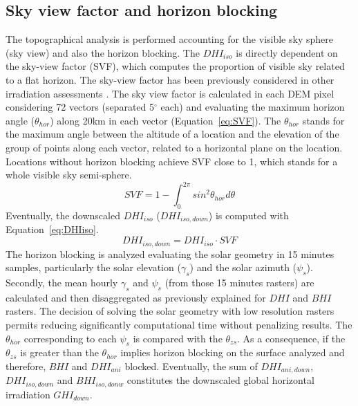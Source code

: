 \documentclass[authoryear, sort&compress]{elsarticle}
\begin{document}
\subsection{Sky view factor and horizon blocking}
\label{sec:sky-view-factor}
The topographical analysis is performed accounting for the visible
sky sphere (sky view) and also the horizon blocking. The
$DHI_{iso}$ is directly dependent on the sky-view factor (SVF),
which computes the proportion of visible sky related to a flat
horizon. The sky-view factor has been previously considered in
other irradiation assessments \citep{Ruiz-Arias.Cebecauer.ea2010, Corripio2003}. The sky view factor is calculated in each DEM
pixel considering 72 vectors (separated 5$^\circ$ each) and evaluating
the maximum horizon angle ($\theta_{hor}$) along 20km in each
vector (Equation~\ref{eq:SVF}). The $\theta_{hor}$ stands for the
maximum angle between the altitude of a location and the elevation
of the group of points along each vector, related to a horizontal
plane on the location. Locations without horizon blocking achieve
SVF close to 1, which stands for a whole visible sky semi-sphere.
\begin{equation}
\label{eq:SVF}
SVF=1-\int_0^{2\pi}sin^{2} \theta_{hor} d\theta
\end{equation}
Eventually, the downscaled $DHI_{iso}$ ($DHI_{iso,down}$) is
computed with Equation~\ref{eq:DHIiso}.
\begin{equation}
\label{eq:DHIiso}
DHI_{iso,down}=DHI_{iso}\cdot{}SVF
\end{equation}
The horizon blocking is analyzed evaluating the solar geometry in
15 minutes samples, particularly the solar elevation
($\gamma_{s}$) and the solar azimuth ($\psi_{s}$). Secondly, the
mean hourly $\gamma_{s}$ and $\psi_{s}$ (from those 15 minutes
rasters) are calculated and then disaggregated as previously
explained for $DHI$ and $BHI$ rasters. The decision of solving the
solar geometry with low resolution rasters permits reducing
significantly computational time without penalizing results.
The $\theta_{hor}$ corresponding to each $\psi_{s}$ is compared
with the $\theta_{zs}$. As a consequence, if the $\theta_{zs}$ is
greater than the $\theta_{hor}$ implies horizon blocking on the
surface analyzed and therefore, $BHI$ and $DHI_{ani}$
blocked. Eventually, the sum of $DHI_{ani,down}$, $DHI_{iso,down}$
and $BHI_{iso,donw}$ constitutes the downscaled global horizontal
irradiation $GHI_{down}$.
\end{document}

